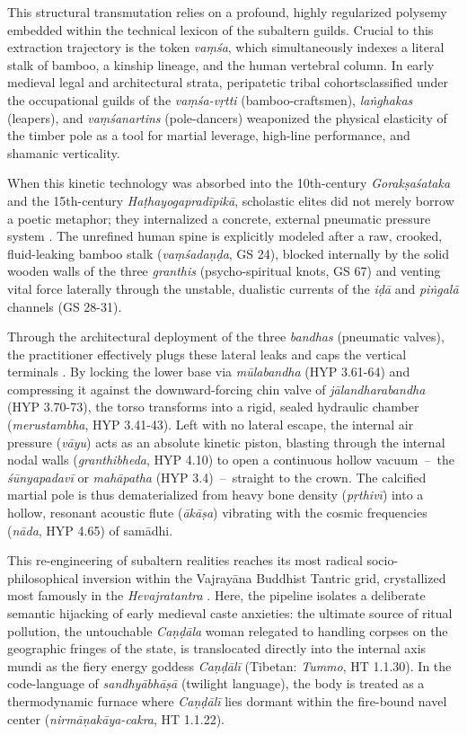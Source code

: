 \documentclass[11pt,twoside,letterpaper]{article}
\renewcommand{\textemdash}{\, -- \,}
\begin{document}
This structural transmutation relies on a profound, highly regularized polysemy embedded within the technical lexicon of the subaltern guilds. Crucial to this extraction trajectory is the token \textit{vaṃśa}, which simultaneously indexes a literal stalk of bamboo, a kinship lineage, and the human vertebral column. In early medieval legal and architectural strata, peripatetic tribal cohorts\textendash classified under the occupational guilds of the \textit{vaṃśa-vṛtti} (bamboo-craftsmen), \textit{la\.{n}ghakas} (leapers), and \textit{vaṃśanartins} (pole-dancers) \textendash weaponized the physical elasticity of the timber pole as a tool for martial leverage, high-line performance, and shamanic verticality. 

When this kinetic technology was absorbed into the 10th-century \textit{Gorakṣaśataka} 
and the 15th-century \textit{Haṭhayogapradīpikā}, scholastic elites did not merely borrow 
a poetic metaphor; they internalized a concrete, external pneumatic pressure system \citep{Mallinson2020, Swatmarama2024}. The unrefined human spine is explicitly modeled after a raw, crooked, fluid-leaking bamboo stalk (\textit{vaṃśadaṇḍa}, GS 24), blocked internally by the solid wooden walls of the three \textit{granthis} (psycho-spiritual knots, GS 67) and venting vital force laterally through the unstable, dualistic currents of the \textit{iḍā} and \textit{pi\.{n}galā} channels (GS 28-31).

Through the architectural deployment of the three \textit{bandhas} (pneumatic valves), the practitioner effectively plugs these lateral leaks and caps the vertical terminals \citep{Swatmarama2024}. By locking the lower base via \textit{mūlabandha} (HYP 3.61-64) and compressing it against the downward-forcing chin valve of \textit{jālandharabandha} (HYP 3.70-73), the torso transforms into a rigid, sealed hydraulic chamber (\textit{merustambha}, HYP 3.41-43). Left with no lateral escape, the internal air pressure (\textit{vāyu}) acts as an absolute kinetic piston, blasting through the internal nodal walls (\textit{granthibheda}, HYP 4.10) to open a continuous hollow vacuum\textemdash the \textit{śūnyapadavī} or \textit{mahāpatha} (HYP 3.4)\textemdash straight to the crown. The calcified martial pole is thus dematerialized from heavy bone density (\textit{pṛthivī}) into a hollow, resonant acoustic flute (\textit{ākāṣa}) vibrating with the cosmic frequencies (\textit{nāda}, HYP 4.65) of samādhi.

This re-engineering of subaltern realities reaches its most radical socio-philosophical inversion within the Vajrayāna Buddhist Tantric grid, crystallized most famously in the \textit{Hevajratantra} \citep{Farrow2003}. Here, the pipeline isolates a deliberate semantic hijacking of early medieval caste anxieties: the ultimate source of ritual pollution, the untouchable \textit{Caṇḍāla} woman relegated to handling corpses on the geographic fringes of the state, is translocated directly into the internal axis mundi as the fiery energy goddess \textit{Caṇḍālī} (Tibetan: \textit{Tummo}, HT 1.1.30). In the code-language of \textit{sandhyābhāṣā} (twilight language), the body is treated as a thermodynamic furnace where \textit{Caṇḍālī} lies dormant within the fire-bound navel center (\textit{nirmāṇakāya-cakra}, HT 1.1.22).
\end{document}
